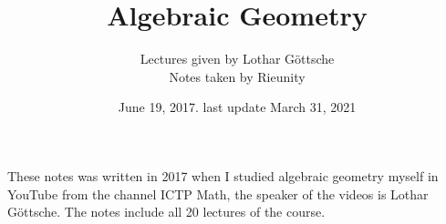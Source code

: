 \documentclass[paper,12pt]{article}
\theoremstyle{plain}
\begin{document}
\title{Algebraic Geometry}
\author{Lectures given by Lothar G\"{o}ttsche\\
\small Notes taken by Rieunity}
\date{June 19, 2017. last update March 31, 2021}
\maketitle
\thispagestyle{empty}

    These notes was written in 2017 when I studied algebraic geometry myself in YouTube from the channel ICTP Math, the speaker of the videos is  Lothar G\"{o}ttsche. The notes include all 20 lectures of the course.
\tableofcontents

\end{document}
